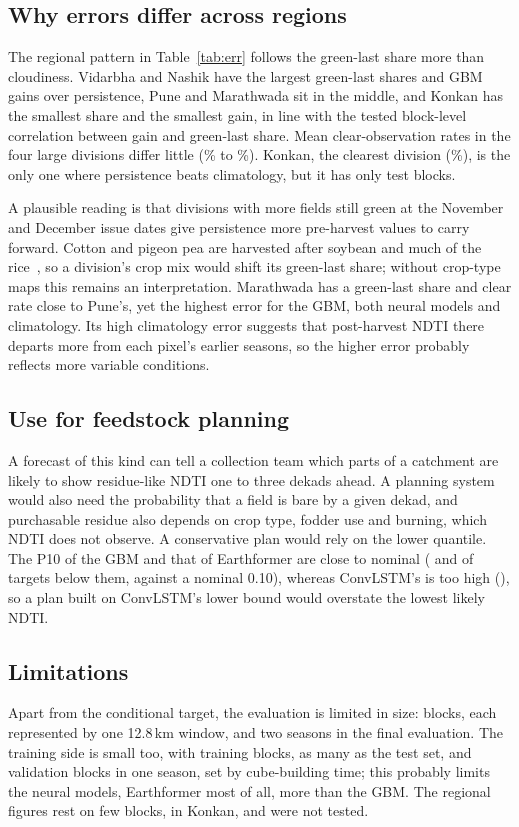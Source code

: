 \documentclass[journal]{IEEEtran}
\begin{document}
\subsection{Why errors differ across regions}
\label{sec:region}
The regional pattern in Table~\ref{tab:err} follows the green-last share more than cloudiness. Vidarbha and Nashik have the largest green-last shares and GBM gains over persistence, Pune and Marathwada sit in the middle, and Konkan has the smallest share and the smallest gain, in line with the tested block-level correlation between gain and green-last share. Mean clear-observation rates in the four large divisions differ little (\finyClearRatePune\% to \finyClearRateVidarbha\%). Konkan, the clearest division (\finyClearRateKonkan\%), is the only one where persistence beats climatology, but it has only \finyNBlocksKonkan{} test blocks.

A plausible reading is that divisions with more fields still green at the November and December issue dates give persistence more pre-harvest values to carry forward. Cotton and pigeon pea are harvested after soybean and much of the rice~\cite{desharvest}, so a division's crop mix would shift its green-last share; without crop-type maps this remains an interpretation. Marathwada has a green-last share and clear rate close to Pune's, yet the highest error for the GBM, both neural models and climatology. Its high climatology error suggests that post-harvest NDTI there departs more from each pixel's earlier seasons, so the higher error probably reflects more variable conditions.

\subsection{Use for feedstock planning}
A forecast of this kind can tell a collection team which parts of a catchment are likely to show residue-like NDTI one to three dekads ahead. A planning system would also need the probability that a field is bare by a given dekad, and purchasable residue also depends on crop type, fodder use and burning, which NDTI does not observe. A conservative plan would rely on the lower quantile. The P10 of the GBM and that of Earthformer are close to nominal (\finyGbmBelow{} and \finyEarthformerBelow{} of targets below them, against a nominal 0.10), whereas ConvLSTM's is too high (\finyConvLSTMBelow), so a plan built on ConvLSTM's lower bound would overstate the lowest likely NDTI.

\subsection{Limitations}
\label{sec:lim}
Apart from the conditional target, the evaluation is limited in size: \finNTestBlocks{} blocks, each represented by one 12.8\,km window, and two seasons in the final evaluation. The training side is small too, with \finxNTrainBlocks{} training blocks, as many as the test set, and \finxNValBlocks{} validation blocks in one season, set by cube-building time; this probably limits the neural models, Earthformer most of all, more than the GBM. The regional figures rest on few blocks, \finyNBlocksKonkan{} in Konkan, and were not tested.
\end{document}
